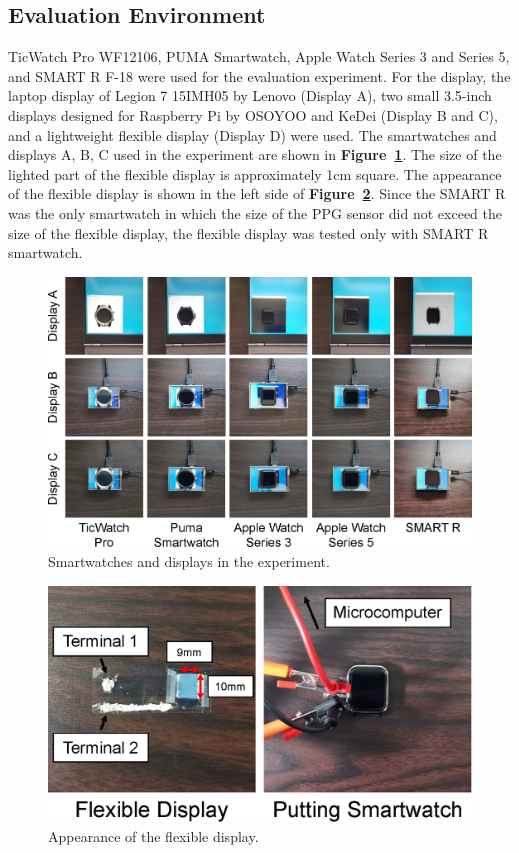 \documentclass[sigchi,authordraft]{acmart}
\newcommand\figref[1]{\textbf{Figure~\ref{fig:#1}}}
\begin{document}
\subsection{Evaluation Environment}
TicWatch Pro WF12106, PUMA Smartwatch, Apple Watch Series 3 and Series 5, and SMART R F-18 were used for the evaluation experiment. For the display, the laptop display of Legion 7 15IMH05 by Lenovo (Display A), two small 3.5-inch displays designed for Raspberry Pi by OSOYOO and KeDei (Display B and C), and a lightweight flexible display (Display D) were used. The smartwatches and displays A, B, C used in the experiment are shown in \figref{smartwatches}. The size of the lighted part of the flexible display is approximately 1cm square. The appearance of the flexible display is shown in the left side of \figref{flexible}. Since the SMART R was the only smartwatch in which the size of the PPG sensor did not exceed the size of the flexible display, the flexible display was tested only with SMART R smartwatch.

\begin{figure}[!t]
  \centering
  \includegraphics[width=0.75\linewidth]{figures/smartwatches.eps}
  \caption{Smartwatches and displays in the experiment.}
  \label{fig:smartwatches}
\end{figure}

\begin{figure}[!t]
  \centering
  \includegraphics[width=0.75\linewidth]{figures/flexible.eps}
  \caption{Appearance of the flexible display.}
  \label{fig:flexible}
\end{figure}
\end{document}
